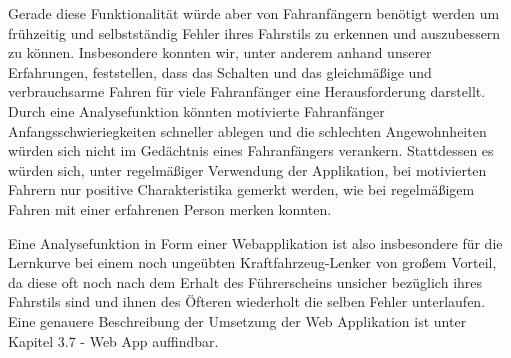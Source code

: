 Gerade diese Funktionalität würde aber von Fahranfängern benötigt werden um frühzeitig und selbstständig Fehler ihres Fahrstils zu erkennen und auszubessern zu können. Insbesondere konnten wir, unter anderem anhand unserer Erfahrungen, feststellen, dass das Schalten und das gleichmäßige und verbrauchsarme Fahren für viele Fahranfänger eine Herausforderung darstellt. Durch eine Analysefunktion könnten motivierte Fahranfänger Anfangsschwieriegkeiten schneller ablegen und die schlechten Angewohnheiten würden sich nicht im  Gedächtnis eines Fahranfängers verankern. Stattdessen es würden sich, unter regelmäßiger Verwendung der Applikation, bei motivierten Fahrern nur positive Charakteristika gemerkt werden, wie bei regelmäßigem Fahren mit einer erfahrenen Person merken konnten.

Eine Analysefunktion in Form einer Webapplikation ist also insbesondere für die Lernkurve bei einem noch ungeübten Kraftfahrzeug-Lenker von großem Vorteil, da diese oft noch nach dem Erhalt des Führerscheins unsicher bezüglich ihres Fahrstils sind und ihnen des Öfteren wiederholt die selben Fehler unterlaufen. Eine genauere Beschreibung der Umsetzung der Web Applikation ist unter Kapitel 3.7 - Web App auffindbar.

\clearpage %
